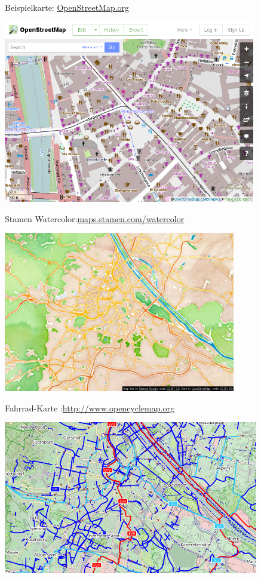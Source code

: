 \documentclass{beamer}
\begin{document}
\begin{frame}{Beispielkarte: \hfill\href{http://www.OpenStreetMap.org}{OpenStreetMap.org}}

 \includegraphics[width=11cm]{osmorg.png}

\end{frame}

\begin{frame}{Stamen Watercolor:\hfill\href{http://maps.stamen.com/watercolor/}{maps.stamen.com/watercolor}}
\begin{center}
\includegraphics[height=7cm]{style-stamen.png}
\end{center}
\end{frame}

\begin{frame}{Fahrrad-Karte :\hfill\url{http://www.opencyclemap.org}}
  \vspace{-0.3cm}
\begin{center}
\includegraphics[height=6.7cm]{style-cycle.png}
\end{center}
\end{frame}
\end{document}
